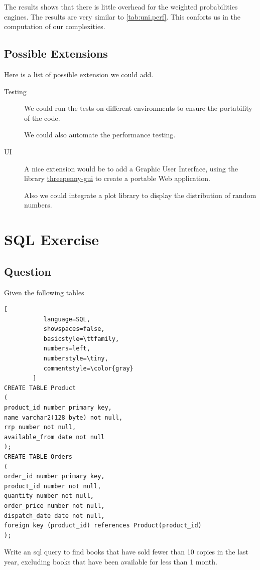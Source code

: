 \documentclass[12pt,a4paper,article]{memoir} %
\begin{document}
The results shows that there is little overhead for the weighted probabilities
engines. The results are very similar to \autoref{tab:uni.perf}.
This conforts us in the computation of our complexities.

\section{Possible Extensions}
\label{sec:ext}
Here is a list of possible extension we could add.
\begin{description}
	\item [Testing]
	We could run the tests on different environments to ensure the portability of 
	the code.
	
	We could also automate the performance testing.
	\item [UI] 
	A nice extension would be to add a Graphic User Interface,
	using the library 
	\href{https://hackage.haskell.org/package/threepenny-gui}{threepenny-gui}
	to create a portable Web application. 

	Also we could integrate a plot library to display the distribution of 
	random numbers.
\end{description}

\newpage
\chapter{SQL Exercise}
\section{Question}
Given the following tables
\begin{lstlisting}[
           language=SQL,
           showspaces=false,
           basicstyle=\ttfamily,
           numbers=left,
           numberstyle=\tiny,
           commentstyle=\color{gray}
        ]
CREATE TABLE Product
(
product_id number primary key,
name varchar2(128 byte) not null,
rrp number not null,
available_from date not null
);
CREATE TABLE Orders
(
order_id number primary key,
product_id number not null,
quantity number not null,
order_price number not null,
dispatch_date date not null,
foreign key (product_id) references Product(product_id)
);
\end{lstlisting}
Write an sql query to find books that have sold fewer than 10 copies in the last year, 
excluding books that have been available for less than 1 month.
\end{document}
